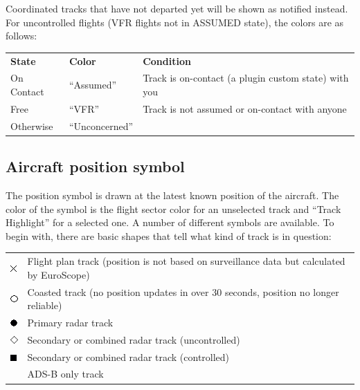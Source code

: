 \documentclass[11pt,a4paper,oldfontcommands]{memoir}
\begin{document}
Coordinated tracks that have not departed yet will be shown as notified instead.\\

For uncontrolled flights (VFR flights not in ASSUMED state), the colors are as follows:\\
\begin{tabular}{l l l}
\textbf{State}  & \textbf{Color}    & \textbf{Condition}
\\On Contact    & “Assumed”         & Track is on-contact (a plugin custom state) with you
\\Free          & “VFR”             & Track is not assumed or on-contact with anyone
\\Otherwise     & “Unconcerned”     &
\end{tabular}

\subsection{Aircraft position symbol}
The position symbol is drawn at the latest known position of the aircraft. The color of the symbol is the
flight sector color for an unselected track and “Track Highlight” for a selected one. A number of different
symbols are available. To begin with, there are basic shapes that tell what kind of track is in question:

\begin{tabular}{l l}
\includegraphics{img/rps_fpasd.png} & Flight plan track (position is not based on surveillance data but calculated by EuroScope)
\\\includegraphics{img/rps_coast.png} & Coasted track (no position updates in over 30 seconds, position no longer reliable)
\\\includegraphics{img/rps_psr.png} & Primary radar track
\\\includegraphics{img/rps_sec.png} & Secondary or combined radar track (uncontrolled)
\\\includegraphics{img/rps_psr+ssr.png} & Secondary or combined radar track (controlled)
\\ & ADS-B only track
\end{tabular}
\end{document}
